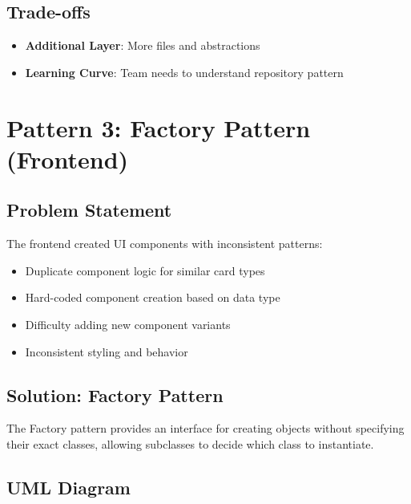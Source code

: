 \documentclass[12pt,a4paper]{article}
\begin{document}
\subsection{Trade-offs}
\begin{itemize}
    \item \textbf{Additional Layer}: More files and abstractions
    \item \textbf{Learning Curve}: Team needs to understand repository pattern
\end{itemize}

\newpage

\section{Pattern 3: Factory Pattern (Frontend)}

\subsection{Problem Statement}

The frontend created UI components with inconsistent patterns:
\begin{itemize}
    \item Duplicate component logic for similar card types
    \item Hard-coded component creation based on data type
    \item Difficulty adding new component variants
    \item Inconsistent styling and behavior
\end{itemize}

\subsection{Solution: Factory Pattern}

The Factory pattern provides an interface for creating objects without specifying their exact classes, allowing subclasses to decide which class to instantiate.

\subsection{UML Diagram}
\end{document}

